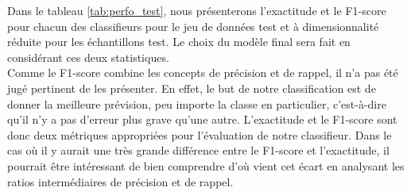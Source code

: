 Dans le tableau \ref{tab:perfo_test}, nous présenterons l'exactitude et le F1-score pour chacun des classifieurs pour le jeu de données test et à dimensionnalité réduite pour les échantillons test. Le choix du modèle final sera fait en considérant ces deux statistiques. \\

Comme le F1-score combine les concepts de précision et de rappel, il n'a pas été jugé pertinent de les présenter. En effet, le but de notre classification est de donner la meilleure prévision, peu importe la classe en particulier, c'est-à-dire qu'il n'y a pas d'erreur plus grave qu'une autre. L'exactitude et le F1-score sont donc deux métriques appropriées pour l'évaluation de notre classifieur. Dans le cas où il y aurait une très grande différence entre le F1-score et l'exactitude, il pourrait être intéressant de bien comprendre d'où vient cet écart en analysant les ratios intermédiaires de précision et de rappel.

\begin{table}[H]
	
\caption{\label{tab:perfo_test}Performances des différents modèles sur le jeu de données de test selon les différentes mesures de performance.}
\centering
{}

\end{table}

